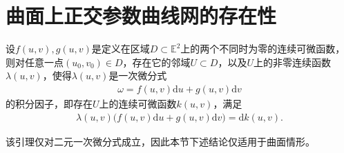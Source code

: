 \documentclass[../../main.tex]{subfiles}%
\begin{document}
\section{曲面上正交参数曲线网的存在性}

\begin{lemma}
设$f(u,v),g(u,v)$是定义在区域$D\subset\mathbb{E}^2$上的两个不同时为零的连续可微函数，则对任意一点$(u_0,v_0)\in D$，存在它的邻域$U\subset D$，以及$U$上的非零连续函数$\lambda(u,v)$，使得$\lambda(u,v)$是一次微分式
\begin{align}
\omega = f(u,v)\mathrm{d}u + g(u,v)\mathrm{d}v
\label{eq:onediffform}
\end{align}
的积分因子，即存在$U$上的连续可微函数$k(u,v)$，满足
\begin{align*}
\lambda(u,v)\big(f(u,v)\mathrm{d}u + g(u,v)\mathrm{d}v\big) = \mathrm{d}k(u,v).
\end{align*}
\end{lemma}
\begin{remark}
该引理仅对二元一次微分式成立，因此本节下述结论仅适用于曲面情形。
\end{remark}
\end{document}
